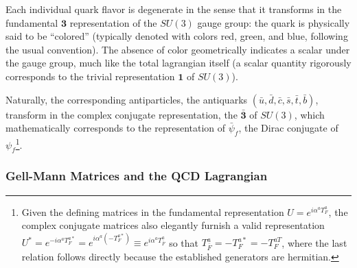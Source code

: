 Each individual quark flavor is degenerate in the sense that it transforms in the fundamental \(\mathbf{3}\) representation of the \(SU(3)\) gauge group: the quark is physically said to be ``colored'' (typically denoted with colors red, green, and blue, following the usual convention). The absence of color geometrically indicates a scalar under the gauge group, much like the total lagrangian itself (a scalar quantity rigorously corresponds to the trivial representation \(\mathbf{1}\) of \(SU(3)\)).

Naturally, the corresponding antiparticles, the antiquarks \((\bar{u}, \bar{d}, \bar{c}, \bar{s}, \bar{t}, \bar{b})\), transform in the complex conjugate representation, the \(\bar{\mathbf{3}}\) of \(SU(3)\), which mathematically corresponds to the representation of \(\bar{\psi}_f\), the Dirac conjugate of \(\psi_f\)\footnote{Given the defining matrices in the fundamental representation \(U = e^{i\alpha^a T_F^a}\), the complex conjugate matrices also elegantly furnish a valid representation \(U^* = e^{-i\alpha^a T_F^{a*}} = e^{i\alpha^a(-T_F^{a*})} \equiv e^{i\alpha^a T_{\bar{F}}^a}\) so that \(T_{\bar{F}}^a = -T_F^{a*} = -T_F^{aT}\), where the last relation follows directly because the established generators are hermitian.}.

\subsubsection{Gell-Mann Matrices and the QCD Lagrangian}

